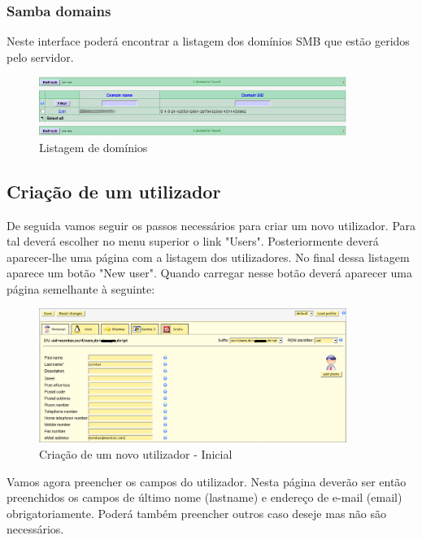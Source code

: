 \subsubsection{Samba domains}

Neste interface poderá encontrar a listagem dos domínios SMB que estão geridos pelo servidor.

\begin{figure}[H]
    \begin{center}
        \includegraphics[width=10cm]{include/img/lam8}
    \end{center}
    \caption{Listagem de domínios}
    \label{fig:LAM8}
\end{figure}

\subsection{Criação de um utilizador}
De seguida vamos seguir os passos necessários para criar um novo utilizador. Para tal deverá escolher no menu superior o link "Users". Posteriormente deverá aparecer-lhe uma página com a listagem dos utilizadores. No final dessa listagem aparece um botão "New user". Quando carregar nesse botão deverá aparecer uma página semelhante à seguinte:

\begin{figure}[H]
    \begin{center}
        \includegraphics[width=10cm]{include/img/lam4}
    \end{center}
    \caption{Criação de um novo utilizador - Inicial}
    \label{fig:LAM9}
\end{figure}

Vamos agora preencher os campos do utilizador. Nesta página deverão ser então preenchidos os campos de último nome (lastname) e endereço de e-mail (email) obrigatoriamente. Poderá também preencher outros caso deseje mas não são necessários.

